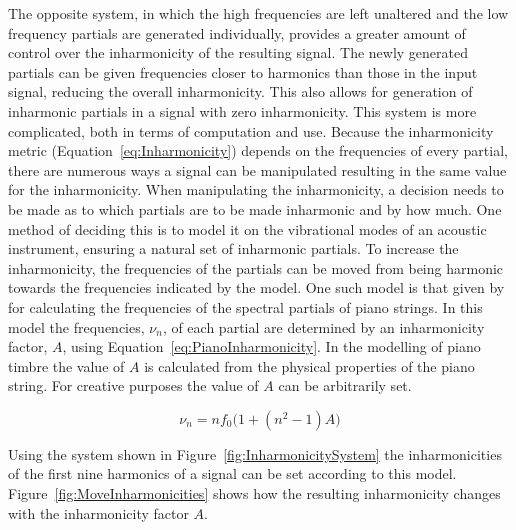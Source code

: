 		The opposite system, in which the high frequencies are left unaltered and the low frequency partials are
		generated individually, provides a greater amount of control over the inharmonicity of the resulting
		signal. The newly generated partials can be given frequencies closer to harmonics than those in the input
		signal, reducing the overall inharmonicity. This also allows for generation of inharmonic partials in a
		signal with zero inharmonicity. This system is more complicated, both in terms of computation and use.
		Because the inharmonicity metric (Equation~\ref{eq:Inharmonicity}) depends on the frequencies of every
		partial, there are numerous ways a signal can be manipulated resulting in the same value for the
		inharmonicity. When manipulating the inharmonicity, a decision needs to be made as to which partials are to
		be made inharmonic and by how much. One method of deciding this is to model it on the vibrational modes of
		an acoustic instrument, ensuring a natural set of inharmonic partials. To increase the inharmonicity, the
		frequencies of the partials can be moved from being harmonic towards the frequencies indicated by the
		model. One such model is that given by \citet{rossing2002the} for calculating the frequencies of the
		spectral partials of piano strings. In this model the frequencies, $\nu_{n}$, of each partial are
		determined by an inharmonicity factor, $A$, using Equation~\ref{eq:PianoInharmonicity}. In the modelling of
		piano timbre the value of $A$ is calculated from the physical properties of the piano string. For creative
		purposes the value of $A$ can be arbitrarily set.

		\begin{equation}
			\nu_{n} = nf_{0} \bigl( 1 + \left( n^{2} - 1 \right) A \bigr)
			\label{eq:PianoInharmonicity}
		\end{equation}

		Using the system shown in Figure~\ref{fig:InharmonicitySystem} the inharmonicities of the first nine
		harmonics of a signal can be set according to this model. Figure~\ref{fig:MoveInharmonicities} shows how
		the resulting inharmonicity changes with the inharmonicity factor $A$.

